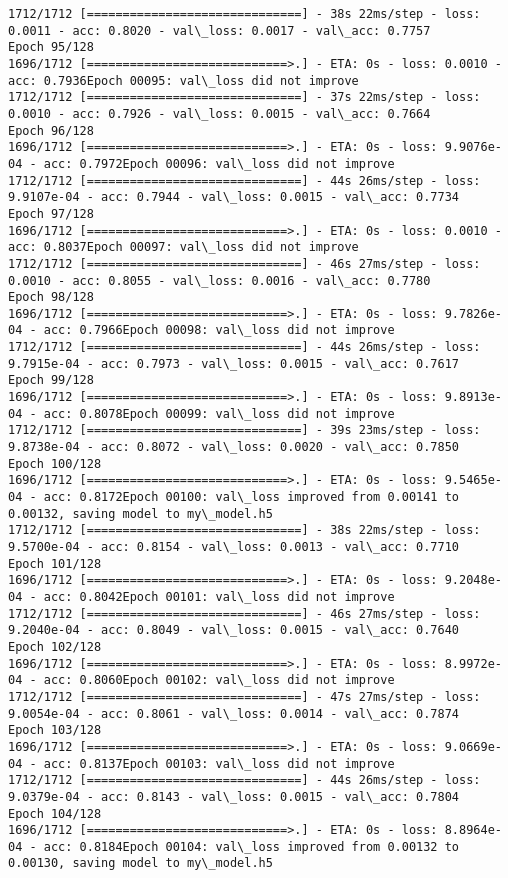 \documentclass[11pt]{article}
\begin{document}
\begin{Verbatim}[commandchars=\\\{\}]
1712/1712 [==============================] - 38s 22ms/step - loss: 0.0011 - acc: 0.8020 - val\_loss: 0.0017 - val\_acc: 0.7757
Epoch 95/128
1696/1712 [============================>.] - ETA: 0s - loss: 0.0010 - acc: 0.7936Epoch 00095: val\_loss did not improve
1712/1712 [==============================] - 37s 22ms/step - loss: 0.0010 - acc: 0.7926 - val\_loss: 0.0015 - val\_acc: 0.7664
Epoch 96/128
1696/1712 [============================>.] - ETA: 0s - loss: 9.9076e-04 - acc: 0.7972Epoch 00096: val\_loss did not improve
1712/1712 [==============================] - 44s 26ms/step - loss: 9.9107e-04 - acc: 0.7944 - val\_loss: 0.0015 - val\_acc: 0.7734
Epoch 97/128
1696/1712 [============================>.] - ETA: 0s - loss: 0.0010 - acc: 0.8037Epoch 00097: val\_loss did not improve
1712/1712 [==============================] - 46s 27ms/step - loss: 0.0010 - acc: 0.8055 - val\_loss: 0.0016 - val\_acc: 0.7780
Epoch 98/128
1696/1712 [============================>.] - ETA: 0s - loss: 9.7826e-04 - acc: 0.7966Epoch 00098: val\_loss did not improve
1712/1712 [==============================] - 44s 26ms/step - loss: 9.7915e-04 - acc: 0.7973 - val\_loss: 0.0015 - val\_acc: 0.7617
Epoch 99/128
1696/1712 [============================>.] - ETA: 0s - loss: 9.8913e-04 - acc: 0.8078Epoch 00099: val\_loss did not improve
1712/1712 [==============================] - 39s 23ms/step - loss: 9.8738e-04 - acc: 0.8072 - val\_loss: 0.0020 - val\_acc: 0.7850
Epoch 100/128
1696/1712 [============================>.] - ETA: 0s - loss: 9.5465e-04 - acc: 0.8172Epoch 00100: val\_loss improved from 0.00141 to 0.00132, saving model to my\_model.h5
1712/1712 [==============================] - 38s 22ms/step - loss: 9.5700e-04 - acc: 0.8154 - val\_loss: 0.0013 - val\_acc: 0.7710
Epoch 101/128
1696/1712 [============================>.] - ETA: 0s - loss: 9.2048e-04 - acc: 0.8042Epoch 00101: val\_loss did not improve
1712/1712 [==============================] - 46s 27ms/step - loss: 9.2040e-04 - acc: 0.8049 - val\_loss: 0.0015 - val\_acc: 0.7640
Epoch 102/128
1696/1712 [============================>.] - ETA: 0s - loss: 8.9972e-04 - acc: 0.8060Epoch 00102: val\_loss did not improve
1712/1712 [==============================] - 47s 27ms/step - loss: 9.0054e-04 - acc: 0.8061 - val\_loss: 0.0014 - val\_acc: 0.7874
Epoch 103/128
1696/1712 [============================>.] - ETA: 0s - loss: 9.0669e-04 - acc: 0.8137Epoch 00103: val\_loss did not improve
1712/1712 [==============================] - 44s 26ms/step - loss: 9.0379e-04 - acc: 0.8143 - val\_loss: 0.0015 - val\_acc: 0.7804
Epoch 104/128
1696/1712 [============================>.] - ETA: 0s - loss: 8.8964e-04 - acc: 0.8184Epoch 00104: val\_loss improved from 0.00132 to 0.00130, saving model to my\_model.h5

\end{Verbatim}
\end{document}
